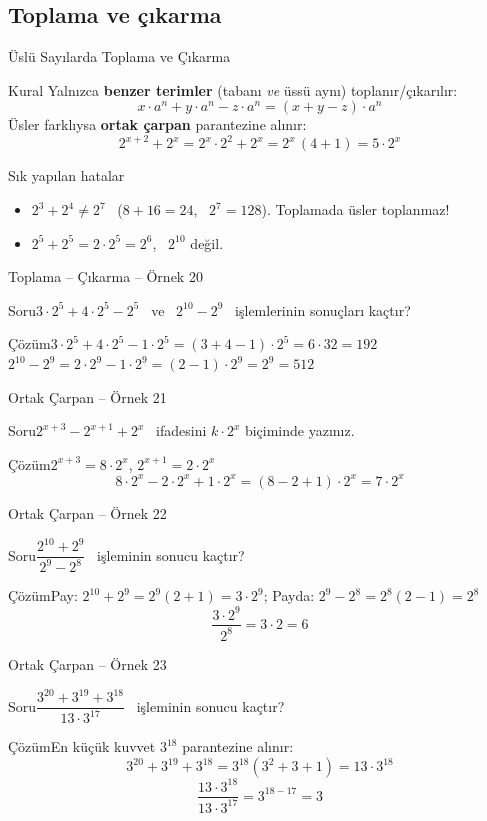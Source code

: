 \documentclass[aspectratio=169,11pt,handout]{beamer}
\newcommand{\soru}[3]{%
\begin{frame}{#1}
  \begin{block}{Soru}\large #2\end{block}
  \pause
  \begin{exampleblock}{Çözüm}\large #3\end{exampleblock}
\end{frame}}
\begin{document}
\subsection{Toplama ve çıkarma}
\begin{frame}{Üslü Sayılarda Toplama ve Çıkarma}
\begin{block}{Kural}
Yalnızca \textbf{benzer terimler} (tabanı \emph{ve} üssü aynı) toplanır/çıkarılır:
\[x\cdot a^n+y\cdot a^n-z\cdot a^n=(x+y-z)\cdot a^n\]
Üsler farklıysa \textbf{ortak çarpan} parantezine alınır:
\[2^{x+2}+2^{x}=2^x\cdot 2^2+2^x=2^x\,(4+1)=5\cdot 2^x\]
\end{block}
\begin{alertblock}{Sık yapılan hatalar}
\begin{itemize}
\item \(2^3+2^4\neq 2^7\) \ (\(8+16=24\), \ \(2^7=128\)). Toplamada üsler toplanmaz!
\item \(2^5+2^5=2\cdot 2^5=2^6\), \ \(2^{10}\) değil.
\end{itemize}
\end{alertblock}
\end{frame}

\soru{Toplama -- Çıkarma -- Örnek 20}
{\(3\cdot 2^5+4\cdot 2^5-2^5\) \ ve \ \(2^{10}-2^{9}\) \ işlemlerinin sonuçları kaçtır?}
{\(3\cdot 2^5+4\cdot 2^5-1\cdot 2^5=(3+4-1)\cdot 2^5=6\cdot 32=192\)\\[4pt]
\(2^{10}-2^{9}=2\cdot 2^{9}-1\cdot 2^{9}=(2-1)\cdot 2^{9}=2^{9}=512\)}

\soru{Ortak Çarpan -- Örnek 21}
{\(2^{x+3}-2^{x+1}+2^{x}\) \ ifadesini \(k\cdot 2^x\) biçiminde yazınız.}
{\(2^{x+3}=8\cdot 2^x\), \quad \(2^{x+1}=2\cdot 2^x\)
\[8\cdot 2^x-2\cdot 2^x+1\cdot 2^x=(8-2+1)\cdot 2^x=7\cdot 2^x\]}

\soru{Ortak Çarpan -- Örnek 22}
{\(\dfrac{2^{10}+2^{9}}{2^{9}-2^{8}}\) \ işleminin sonucu kaçtır?}
{Pay: \(2^{10}+2^{9}=2^{9}(2+1)=3\cdot 2^{9}\); \quad Payda: \(2^{9}-2^{8}=2^{8}(2-1)=2^{8}\)
\[\frac{3\cdot 2^{9}}{2^{8}}=3\cdot 2=6\]}

\soru{Ortak Çarpan -- Örnek 23}
{\(\dfrac{3^{20}+3^{19}+3^{18}}{13\cdot 3^{17}}\) \ işleminin sonucu kaçtır?}
{En küçük kuvvet \(3^{18}\) parantezine alınır:
\[3^{20}+3^{19}+3^{18}=3^{18}(3^2+3+1)=13\cdot 3^{18}\]
\[\frac{13\cdot 3^{18}}{13\cdot 3^{17}}=3^{18-17}=3\]}
\end{document}
